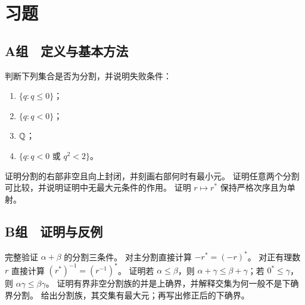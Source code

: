 \section*{习题}

\subsection*{A组　定义与基本方法}
\begin{enumerate}[label=\textbf{\thechapter.\arabic*.}]
  判断下列集合是否为分割，并说明失败条件：
 \begin{enumerate}[label=(\arabic*)]
  \item \(\{q:q\le0\}\)；\item \(\{q:q<0\}\)；\item \(\mathbb{Q}\)；\item \(\{q:q<0\text{ 或 }q^2<2\}\)。
 \end{enumerate}
  证明分割的右部非空且向上封闭，并刻画右部何时有最小元。
  证明任意两个分割可比较，并说明证明中无最大元条件的作用。
  证明 \(r\mapsto r^*\) 保持严格次序且为单射。
\end{enumerate}

\subsection*{B组　证明与反例}
\begin{enumerate}[label=\textbf{\thechapter.\arabic*.},resume]
  完整验证 \(\alpha+\beta\) 的分割三条件。
  对主分割直接计算 \(-r^*=(-r)^*\)。
  对正有理数 \(r\) 直接计算 \((r^*)^{-1}=(r^{-1})^*\)。
  证明若 \(\alpha\le\beta\)，则 \(\alpha+\gamma\le\beta+\gamma\)；若 \(0^*\le\gamma\)，则 \(\alpha\gamma\le\beta\gamma\)。
  证明有界非空分割族的并是上确界，并解释交集为何一般不是下确界分割。
  给出分割族，其交集有最大元；再写出修正后的下确界。
\end{enumerate}


